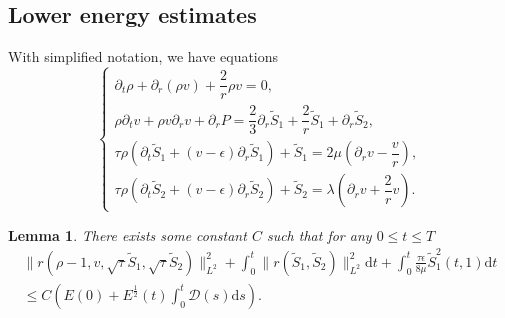 \documentclass[10pt,reqno]{amsart}
\numberwithin{equation}{section}
\newtheorem{lemma}[theorem]{Lemma}
\begin{document}
	\subsection{Lower energy estimates}
	With simplified notation, we have equations
	\begin{equation} \label{3.4}
		\begin{cases}
			\partial_t \rho+\partial_r(\rho v)+\dfrac{2}{r} \rho v=0, \\
			\rho\partial_t v+\rho v \partial_r v+\partial_r P=\dfrac{2}{3}\partial_r \tilde{S}_1 +\dfrac{2}{r} \tilde{S}_1+\partial_r \tilde{S}_2,\\
			\tau  \rho \left(\partial_t \tilde{S}_1+(v-\epsilon)\partial_r\tilde{S}_1 \right) +\tilde{S}_1=2\mu\left(\partial_r v- \dfrac{v}{r}\right)
			, \\
			\tau  \rho \left(\partial_t \tilde{S}_2+(v-\epsilon)\partial_r\tilde{S}_2 \right) +\tilde{S}_2=\lambda (\partial_r v+\dfrac{2}{r}v)
			.
		\end{cases}
	\end{equation}
	\begin{lemma}\label{lem1}
		There exists some constant $C$ such that for any $0\le t \le T$
		\begin{align}
			\|r(\rho-1, v, \sqrt{\tau  } \tilde{S}_1, \sqrt{\tau } \tilde{S}_2)\|_{L^2}^2+\int_0^t\|r(\tilde{S}_1,\tilde{S}_2)\|_{L^2}^2 \mathrm{d}t 
			+\int_{0}^{t}\frac{\tau \epsilon}{8 \mu} \tilde{S}_1^2(t,1)\mathrm{d}t \nonumber\\
			\leq 
			C \left(E(0)+E^{\frac{1}{2}}(t) \int_0^t \mathcal{D}(s) \mathrm{d}s\right).
		\end{align}
	\end{lemma}
	
\end{document}

